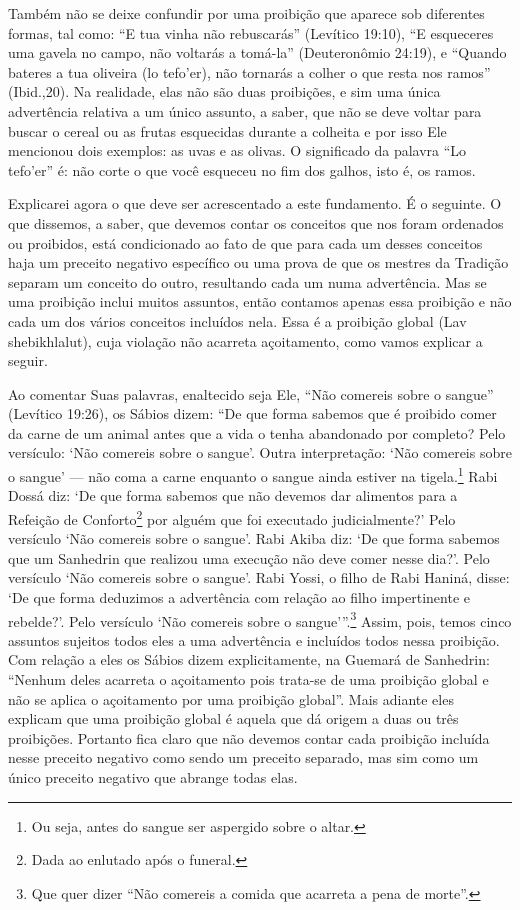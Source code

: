 Também não se deixe confundir por uma proibição que aparece sob
diferentes formas, tal como: ``E tua vinha não rebuscarás'' (Levítico
19:10), ``E esqueceres uma gavela no campo, não voltarás a tomá-la''
(Deuteronômio 24:19), e ``Quando bateres a tua oliveira (lo tefo'er),
não tornarás a colher o que resta nos ramos'' (Ibid.,20). Na realidade,
elas não são duas proibições, e sim uma única advertência relativa a um
único assunto, a saber, que não se deve voltar para buscar o cereal ou
as frutas esquecidas durante a colheita e por isso Ele mencionou dois
exemplos: as uvas e as olivas. O significado da palavra ``Lo tefo'er''
é: não corte o que você esqueceu no fim dos galhos, isto é, os ramos.

Explicarei agora o que deve ser acrescentado a este fundamento. É o
seguinte. O que dissemos, a saber, que devemos contar os conceitos que
nos foram ordenados ou proibidos, está condicionado ao fato de que para
cada um desses conceitos haja um preceito negativo específico ou uma
prova de que os mestres da Tradição separam um conceito do outro,
resultando cada um numa advertência. Mas se uma proibição inclui muitos
assuntos, então contamos apenas essa proibição e não cada um dos vários
conceitos incluídos nela. Essa é a proibição global (Lav shebikhlalut),
cuja violação não acarreta açoitamento, como vamos explicar a seguir.

Ao comentar Suas palavras, enaltecido seja Ele, ``Não comereis sobre o
sangue'' (Levítico 19:26), os Sábios dizem: ``De que forma sabemos que é
proibido comer da carne de um animal antes que a vida o tenha abandonado
por completo? Pelo versículo: `Não comereis sobre o sangue'. Outra
interpretação: `Não comereis sobre o sangue' --- não coma a carne
enquanto o sangue ainda estiver na tigela.\footnote{Ou seja, antes do sangue ser aspergido sobre o altar.} Rabi
Dossá diz: `De que forma sabemos que não devemos dar alimentos para a
Refeição de Conforto\footnote{Dada ao enlutado após o funeral.} por alguém que foi executado
judicialmente?' Pelo versículo `Não comereis sobre o sangue'. Rabi Akiba
diz: `De que forma sabemos que um Sanhedrin que realizou uma execução
não deve comer nesse dia?'. Pelo versículo `Não comereis sobre o
sangue'. Rabi Yossi, o filho de Rabi Haniná, disse: `De que forma
deduzimos a advertência com relação ao filho impertinente e rebelde?'.
Pelo versículo `Não comereis sobre o sangue'''.\footnote{Que quer dizer ``Não comereis a comida que acarreta a pena de
  morte''.}
Assim, pois, temos cinco assuntos sujeitos todos eles a uma advertência
e incluídos todos nessa proibição. Com relação a eles os Sábios dizem
explicitamente, na Guemará de Sanhedrin: ``Nenhum deles acarreta o
açoitamento pois trata-se de uma proibição global e não se aplica o
açoitamento por uma proibição global''. Mais adiante eles explicam que
uma proibição global é aquela que dá origem a duas ou três proibições.
Portanto fica claro que não devemos contar cada proibição incluída
nesse preceito negativo como sendo um preceito separado, mas sim como um
único preceito negativo que abrange todas elas.


